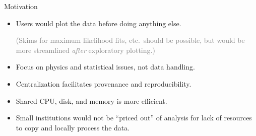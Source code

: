 \documentclass{beamer}
\begin{document}
\begin{frame}{Motivation}
\large
\vspace{0.5 cm}
\begin{itemize}\setlength{\itemsep}{0.5 cm}
\item Users would plot the data before doing anything else.

\vspace{0.2 cm}
\textcolor{gray}{\normalsize (Skims for maximum likelihood fits, etc.\ should be possible, but would be more streamlined {\it after} exploratory plotting.)}

\vspace{-0.2 cm}
\item Focus on physics and statistical issues, not data handling.
\item Centralization facilitates provenance and reproducibility.
\item Shared CPU, disk, and memory is more efficient.
\item Small institutions would not be ``priced out'' of analysis for lack of resources to copy and locally process the data.
\end{itemize}
\end{frame}
\end{document}
